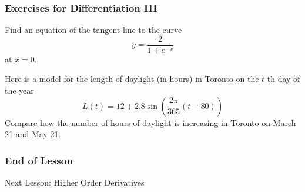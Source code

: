 \documentclass[xcolor=dvipsnames,handout]{beamer}
\begin{document}
\begin{frame}
  \frametitle{Exercises for Differentiation III}
Find an equation of the tangent line to the curve
\begin{equation}
  \label{eq:vaixohga}
  y=\frac{2}{1+e^{-x}}
\end{equation}
at $x=0$.

\bigskip

Here is a model for the length of daylight (in hours) in Toronto on
the $t$-th day of the year
\begin{equation}
  \label{eq:iefeuvae}
  L(t)=12+2.8\sin\left(\frac{2\pi}{365}(t-80)\right)
\end{equation}
Compare how the number of hours of daylight is increasing in Toronto
on March 21 and May 21.
\end{frame}

\begin{frame}
  \frametitle{End of Lesson}
Next Lesson: Higher Order Derivatives
\end{frame}
\end{document}
